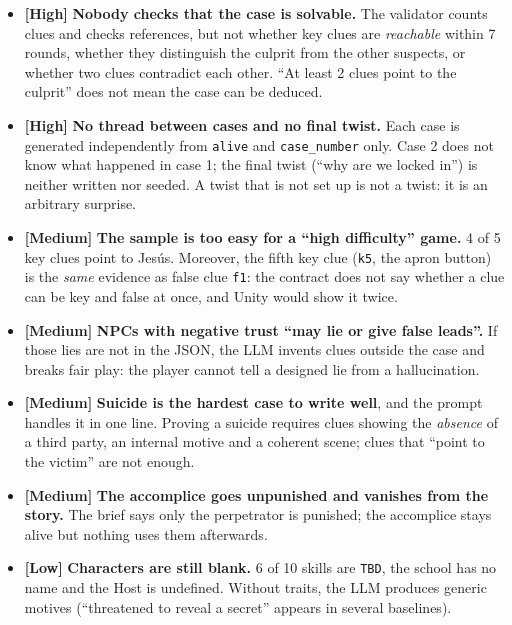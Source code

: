 \documentclass[11pt,a4paper]{article}
\newcommand{\prio}[1]{\textbf{\color{neon}[#1]}}
\begin{document}
\begin{debil}
\begin{itemize}
\item \prio{High} \textbf{Nobody checks that the case is solvable.} The validator counts clues and
checks references, but not whether key clues are \emph{reachable} within 7 rounds, whether they
distinguish the culprit from the other suspects, or whether two clues contradict each other. ``At
least 2 clues point to the culprit'' does not mean the case can be deduced.
\item \prio{High} \textbf{No thread between cases and no final twist.} Each case is generated
independently from \texttt{alive} and \texttt{case\_number} only. Case 2 does not know what happened
in case 1; the final twist (``why are we locked in'') is neither written nor seeded. A twist that is
not set up is not a twist: it is an arbitrary surprise.
\item \prio{Medium} \textbf{The sample is too easy for a ``high difficulty'' game.} 4 of 5 key clues
point to Jesús. Moreover, the fifth key clue (\texttt{k5}, the apron button) is the \emph{same}
evidence as false clue \texttt{f1}: the contract does not say whether a clue can be key and false at
once, and Unity would show it twice.
\item \prio{Medium} \textbf{NPCs with negative trust ``may lie or give false leads''.} If those lies
are not in the JSON, the LLM invents clues outside the case and breaks fair play: the player cannot
tell a designed lie from a hallucination.
\item \prio{Medium} \textbf{Suicide is the hardest case to write well}, and the prompt handles it in
one line. Proving a suicide requires clues showing the \emph{absence} of a third party, an internal
motive and a coherent scene; clues that ``point to the victim'' are not enough.
\item \prio{Medium} \textbf{The accomplice goes unpunished and vanishes from the story.} The brief
says only the perpetrator is punished; the accomplice stays alive but nothing uses them afterwards.
\item \prio{Low} \textbf{Characters are still blank.} 6 of 10 skills are \texttt{TBD}, the school
has no name and the Host is undefined. Without traits, the LLM produces generic motives (``threatened
to reveal a secret'' appears in several baselines).
\end{itemize}
\end{debil}
\end{document}
